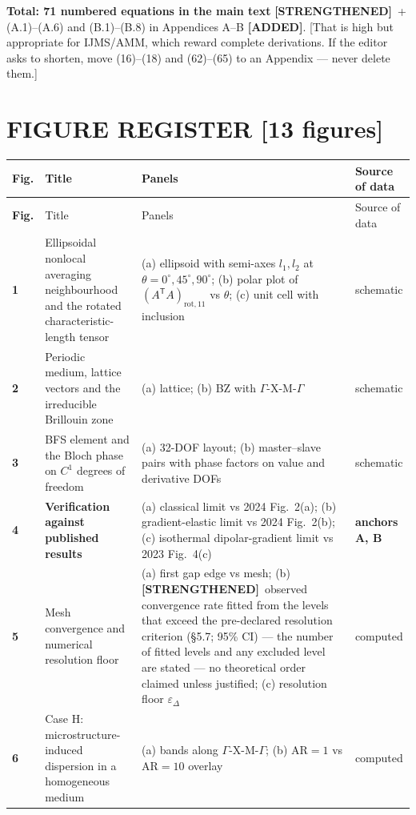 \documentclass[11pt,a4paper]{article}
\newcommand{\bp}[1]{\textcolor{accent}{\textsf{\footnotesize [#1]}}}
\newcommand{\ADDED}{{\color{addcol}\textbf{[ADDED]}}}
\newcommand{\STR}{{\color{strcol}\textbf{[STRENGTHENED]}}}
\begin{document}
\textbf{Total: 71 numbered equations in the main text} \STR\ + (A.1)--(A.6) and (B.1)--(B.8) in Appendices A--B \ADDED.
\bp{That is high but appropriate for IJMS/AMM, which reward complete derivations. If the editor asks to shorten, move (16)--(18) and (62)--(65) to an Appendix --- never delete them.}

\newpage
\section{FIGURE REGISTER \bp{13 figures}}
\label{sec:figures}

\begin{xltabular}{\textwidth}{@{}>{\bfseries}p{1.05cm} L{4.15cm} Y L{2.15cm}@{}}
\toprule
Fig. & Title & Panels & Source of data \\
\midrule
\endfirsthead
\toprule
Fig. & Title & Panels & Source of data \\
\midrule
{} & Ellipsoidal nonlocal averaging neighbourhood and the rotated characteristic-length tensor & (a) ellipsoid with semi-axes $l_1,l_2$ at $\theta=0^\circ,45^\circ,90^\circ$; (b) polar plot of $(A^{\mathsf T}\!A)_{\mathrm{rot},11}$ vs $\theta$; (c) unit cell with inclusion & schematic \\
2 & Periodic medium, lattice vectors and the irreducible Brillouin zone & (a) lattice; (b) BZ with $\Gamma$-X-M-$\Gamma$ & schematic \\
3 & BFS element and the Bloch phase on $C^1$ degrees of freedom & (a) 32-DOF layout; (b) master--slave pairs with phase factors on value and derivative DOFs & schematic \\
4 & \textbf{Verification against published results} & (a) classical limit vs 2024 Fig.~2(a); (b) gradient-elastic limit vs 2024 Fig.~2(b); (c) isothermal dipolar-gradient limit vs 2023 Fig.~4(c) & \textbf{anchors A, B} \\
5 & Mesh convergence and numerical resolution floor & (a) first gap edge vs mesh; (b) \STR\ observed convergence rate fitted from the levels that exceed the pre-declared resolution criterion (\S5.7; 95\% CI) --- the number of fitted levels and any excluded level are stated --- no theoretical order claimed unless justified; (c) resolution floor $\varepsilon_\Delta$ & computed \\
6 & Case H: microstructure-induced dispersion in a homogeneous medium & (a) bands along $\Gamma$-X-M-$\Gamma$; (b) $\mathrm{AR}=1$ vs $\mathrm{AR}=10$ overlay & computed \\

\end{xltabular}
\end{document}
